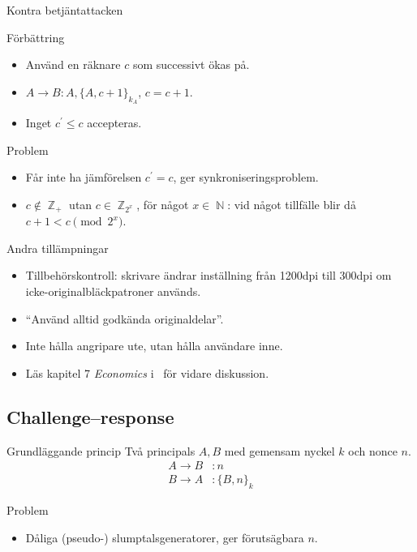 \documentclass{beamer}
\theoremstyle{definition}
\theoremstyle{remark}
\DeclareMathOperator{\N}{\mathbb{N}}
\DeclareMathOperator{\Z}{\mathbb{Z}}
\newcommand{\encrypt}[2]{\{#1\}_{#2}}
\begin{document}
\begin{frame}{Kontra betjäntattacken}
  \begin{block}{Förbättring}
    \begin{itemize}
      \item Använd en räknare \(c\) som successivt ökas på.
      \item \(A\to B\colon A, \encrypt{A, c+1}{k_A}\), \(c = c+1\).
      \item Inget \(c^\prime \leq c\) accepteras.
    \end{itemize}
  \end{block}
  \begin{block}{Problem}
    \begin{itemize}
      \item Får inte ha jämförelsen \(c^\prime = c\), ger 
        synkroniseringsproblem.
      \item \(c\notin \Z_+\) utan \(c\in \Z_{2^x}\), för något \(x\in \N\): vid 
        något tillfälle blir då \(c+1 < c \pmod{2^x}\).
    \end{itemize}
  \end{block}
\end{frame}

\begin{frame}{Andra tillämpningar}
  \begin{itemize}
    \item Tillbehörskontroll: skrivare ändrar inställning från \unit{1200}{dpi} 
      till \unit{300}{dpi} om icke-originalbläckpatroner används.
    \item \enquote{Använd alltid godkända originaldelar}.
    \item Inte hålla angripare ute, utan hålla användare inne.
    \item Läs kapitel 7 \emph{Economics} i~\cite{Anderson2008sea} för vidare 
      diskussion.
  \end{itemize}
\end{frame}

\subsection{Challenge--response}

\begin{frame}
  \begin{block}{Grundläggande princip}
    Två principals \(A, B\) med gemensam nyckel \(k\) och nonce \(n\).
    \begin{align*}
      A\to B &\colon n \\
      B\to A &\colon \encrypt{B, n}{k}
    \end{align*}
  \end{block}
  \begin{block}{Problem}
    \begin{itemize}
      \item Dåliga (pseudo-) slumptalsgeneratorer, ger förutsägbara \(n\).
    \end{itemize}
  \end{block}
\end{frame}
\end{document}
